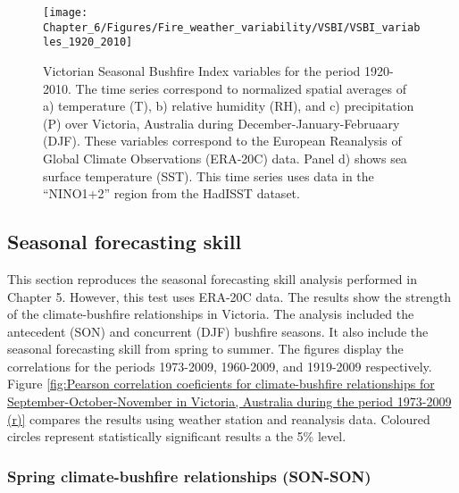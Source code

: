 \begin{figure}[h]
\noindent \begin{centering}
\texttt{[image: Chapter\_6/Figures/Fire\_weather\_variability/VSBI/VSBI\_variables\_1920\_2010]}
\par\end{centering}

\caption[Victorian Seasonal Bushfire Index variables for the period 1920-2010]{Victorian Seasonal Bushfire Index variables for the period 1920-2010.
The time series correspond to normalized spatial averages of a) temperature
(T), b) relative humidity (RH), and c) precipitation (P) over Victoria,
Australia during December-January-Februaary (DJF). These variables
correspond to the European Reanalysis of Global Climate Observations
(ERA-20C) data. Panel d) shows sea surface temperature (SST). This
time series uses data in the ``NINO1+2'' region from the HadISST
dataset. \label{fig:Victorian Seasonal Bushfire Index variables time series during December-January-February in Victoria, Australia for the period 1920-2010 (r)}}


\end{figure}



\subsection{Seasonal forecasting skill}

This section reproduces the seasonal forecasting skill analysis performed
in Chapter 5. However, this test uses ERA-20C data. The results show
the strength of the climate-bushfire relationships in Victoria. The
analysis included the antecedent (SON) and concurrent (DJF) bushfire
seasons. It also include the seasonal forecasting skill from spring
to summer. The figures display the correlations for the periods 1973-2009,
1960-2009, and 1919-2009 respectively. Figure \ref{fig:Pearson correlation coeficients for climate-bushfire relationships for September-October-November in Victoria, Australia during the period 1973-2009 (r)}
compares the results using weather station and reanalysis data. Coloured
circles represent statistically significant results a the 5\% level.


\subsubsection{Spring climate-bushfire relationships (SON-SON)}

